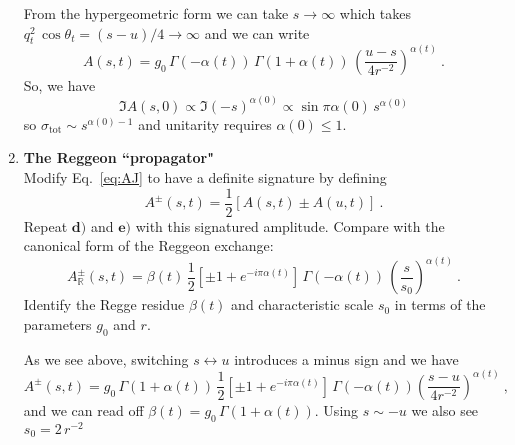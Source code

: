 \begin{enumerate}
          \begin{solution}
              From the hypergeometric form we can take $s\to \infty$ which takes $q_t^2 \, \cos\theta_t = (s-u)/4 \to \infty$ and we can write
              \begin{equation}
                  A(s,t) = g_0 \, \Gamma(-\alpha(t)) \, \Gamma(1+\alpha(t)) \, \left(\frac{u-s}{4r^{-2}}\right)^{\alpha(t)} ~.
              \end{equation}
              So, we have
              \begin{equation}
                  \Im A(s,0) \propto \Im (-s)^{\alpha(0)} \propto \sin \pi \alpha(0) \, s^{\alpha(0)}
              \end{equation}
              so $\sigma_\text{tot} \sim s^{\alpha(0)-1}$ and unitarity requires $\alpha(0) \leq 1$.
          \end{solution}

    \item \textbf{The Reggeon ``propagator"} \\
          Modify Eq.~\ref{eq:AJ} to have a definite signature by defining
          \begin{equation}
              A^{\pm}(s,t) = \frac{1}{2}\left[A(s,t) \pm A(u,t) \right]~.
          \end{equation}
          Repeat $\textbf{d)}$ and  $\textbf{e)}$ with this signatured amplitude. Compare with the canonical form of the Reggeon exchange:
          \begin{equation}
              A^\pm_\mathbb{R}(s,t) = \beta(t) \, \frac{1}{2}\left[\pm1 + e^{-i\pi\alpha(t)}\right] \, \Gamma(-\alpha(t)) \, \left(\frac{s}{s_0}\right)^{\alpha(t)} ~.
          \end{equation}
          Identify the Regge residue $\beta(t)$ and characteristic scale $s_0$ in terms of the parameters $g_0$ and $r$.

          \begin{solution}
              As we see above, switching $s\leftrightarrow u$ introduces a minus sign and we have
              \begin{equation}
                  A^\pm(s,t) = g_0 \, \Gamma(1+\alpha(t)) \, \frac{1}{2}[\pm1 + e^{-i\pi\alpha(t)}] \, \Gamma(-\alpha(t)) \left(\frac{s-u}{4r^{-2}}\right)^{\alpha(t)} ~,
              \end{equation}
              and we can read off $\beta(t) = g_0 \, \Gamma(1+\alpha(t))$. Using $s \sim -u$ we also see $s_0 = 2 \, r^{-2}$
          \end{solution}

\end{enumerate}